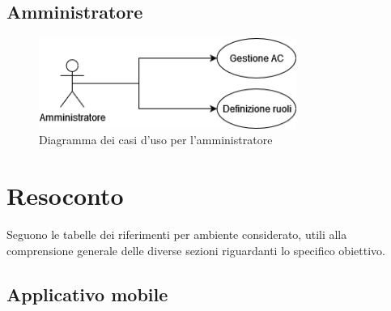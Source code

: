 \documentclass{article}
\begin{document}
\subsection{Amministratore}

\begin{figure}[htbp]
    \centering
    \includegraphics[width=0.75\textwidth]{Images/UseCase_Diagram - Amministratore.png}
    \caption{Diagramma dei casi d'uso per l'amministratore}
\end{figure}
\clearpage

\section{Resoconto}

Seguono le tabelle dei riferimenti per ambiente considerato, utili alla comprensione generale delle diverse sezioni riguardanti lo specifico obiettivo.\\

\subsection{Applicativo mobile}
\end{document}
